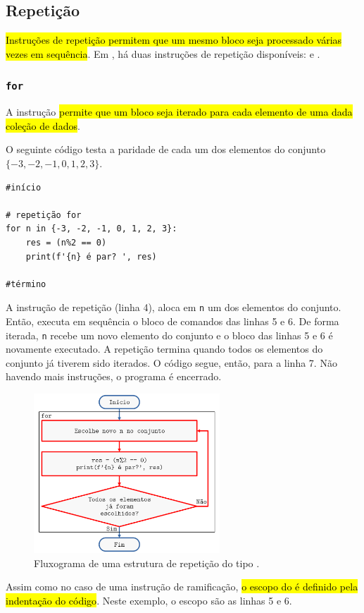 \subsection{Repetição}

\hl{Instruções de repetição permitem que um mesmo bloco seja processado várias vezes em sequência}. Em {\python}, há duas instruções de repetição disponíveis: {\PYTHONfor} e {\PYTHONwhile}. 

\subsubsection{\texttt{for}}

A instrução \hl{{\PYTHONfor} permite que um bloco seja iterado para cada elemento de uma dada coleção de dados}.

\begin{ex}\label{cap_progest_sec_est:ex:for}
  O seguinte código testa a paridade de cada um dos elementos do conjunto $\{-3, -2, -1, 0, 1, 2, 3\}$.

\begin{lstlisting}
#início

# repetição for
for n in {-3, -2, -1, 0, 1, 2, 3}:
    res = (n%2 == 0)
    print(f'{n} é par? ', res)
    
#término
\end{lstlisting}

A instrução de repetição {\PYTHONfor} (linha 4), aloca em \lstinline+n+ um dos elementos do conjunto. Então, executa em sequência o bloco de comandos das linhas 5 e 6. De forma iterada, \lstinline+n+ recebe um novo elemento do conjunto e o bloco das linhas 5 e 6 é novamente executado. A repetição termina quando todos os elementos do conjunto já tiverem sido iterados. O código segue, então, para a linha 7. Não havendo mais instruções, o programa é encerrado.

\begin{figure}[H]
  \centering
  \includegraphics[width=2.75in]{./cap_progest/dados/fig_fg_for/fig.png}
  \caption{Fluxograma de uma estrutura de repetição do tipo {\PYTHONfor}.}
  \label{cap_progest_sec_est:fig:fg_for}
\end{figure}

Assim como no caso de uma instrução de ramificação, \hl{o escopo do {\PYTHONfor} é definido pela indentação do código}. Neste exemplo, o escopo são as linhas 5 e 6.
\end{ex}

